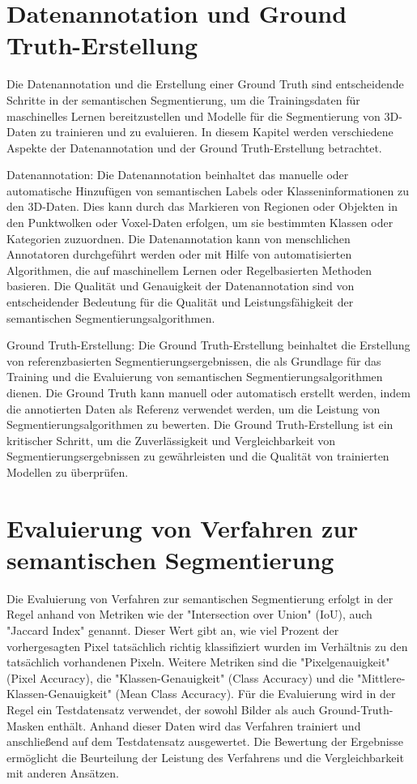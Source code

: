 \section{Datenannotation und Ground Truth-Erstellung}

Die Datenannotation und die Erstellung einer Ground Truth sind entscheidende
Schritte in der semantischen Segmentierung, um die Trainingsdaten für
maschinelles Lernen bereitzustellen und Modelle für die Segmentierung von
3D-Daten zu trainieren und zu evaluieren. In diesem Kapitel werden verschiedene
Aspekte der Datenannotation und der Ground Truth-Erstellung betrachtet.

Datenannotation: Die Datenannotation beinhaltet das manuelle oder automatische
Hinzufügen von semantischen Labels oder Klasseninformationen zu den 3D-Daten.
Dies kann durch das Markieren von Regionen oder Objekten in den Punktwolken
oder Voxel-Daten erfolgen, um sie bestimmten Klassen oder Kategorien
zuzuordnen. Die Datenannotation kann von menschlichen Annotatoren durchgeführt
werden oder mit Hilfe von automatisierten Algorithmen, die auf maschinellem
Lernen oder Regelbasierten Methoden basieren. Die Qualität und Genauigkeit der
Datenannotation sind von entscheidender Bedeutung für die Qualität und
Leistungsfähigkeit der semantischen Segmentierungsalgorithmen.

Ground Truth-Erstellung: Die Ground Truth-Erstellung beinhaltet die Erstellung
von referenzbasierten Segmentierungsergebnissen, die als Grundlage für das
Training und die Evaluierung von semantischen Segmentierungsalgorithmen dienen.
Die Ground Truth kann manuell oder automatisch erstellt werden, indem die
annotierten Daten als Referenz verwendet werden, um die Leistung von
Segmentierungsalgorithmen zu bewerten. Die Ground Truth-Erstellung ist ein
kritischer Schritt, um die Zuverlässigkeit und Vergleichbarkeit von
Segmentierungsergebnissen zu gewährleisten und die Qualität von trainierten
Modellen zu überprüfen.

\section{Evaluierung von Verfahren zur semantischen Segmentierung}
Die Evaluierung von Verfahren zur semantischen Segmentierung erfolgt in der
Regel anhand von Metriken wie der "Intersection over Union" (IoU), auch
"Jaccard Index" genannt. Dieser Wert gibt an, wie viel Prozent der
vorhergesagten Pixel tatsächlich richtig klassifiziert wurden im Verhältnis zu
den tatsächlich vorhandenen Pixeln. Weitere Metriken sind die
"Pixelgenauigkeit" (Pixel Accuracy), die "Klassen-Genauigkeit" (Class Accuracy)
und die "Mittlere-Klassen-Genauigkeit" (Mean Class Accuracy). Für die
Evaluierung wird in der Regel ein Testdatensatz verwendet, der sowohl Bilder
als auch Ground-Truth-Masken enthält. Anhand dieser Daten wird das Verfahren
trainiert und anschließend auf dem Testdatensatz ausgewertet. Die Bewertung der
Ergebnisse ermöglicht die Beurteilung der Leistung des Verfahrens und die
Vergleichbarkeit mit anderen Ansätzen.
